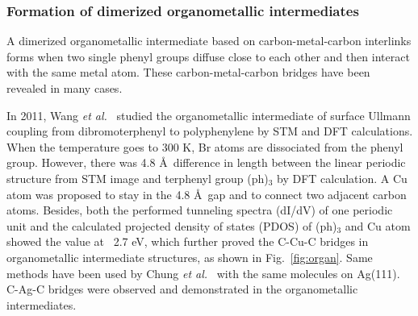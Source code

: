 \documentclass[%
 reprint,
 amsmath,amssymb,
 aps,
prb,
]{revtex4-1}
\begin{document}


\subsubsection{Formation of dimerized organometallic intermediates}

A dimerized organometallic intermediate based on carbon-metal-carbon interlinks forms when two single phenyl groups diffuse close to each other and then interact with the same metal atom. These carbon-metal-carbon bridges have been revealed in many cases. 

In 2011, Wang \textit{et al.}~\cite{jacs2011} studied the organometallic intermediate of surface Ullmann coupling from dibromoterphenyl to polyphenylene by STM and DFT calculations. When the temperature goes to 300 K, Br atoms are dissociated from the phenyl group. However, there was 4.8 \AA\ difference in length between the linear periodic structure from STM image and terphenyl group (ph)$_{3}$ by DFT calculation. A Cu atom was proposed to stay in the 4.8 \AA\ gap and to connect two adjacent carbon atoms. Besides, both the performed tunneling spectra (dI/dV) of one periodic unit and the calculated projected density of states (PDOS) of (ph)$_{3}$ and Cu atom showed the value at ~2.7 eV, which further proved the C-Cu-C bridges in organometallic intermediate structures, as shown in Fig.~\ref{fig:organ}. Same methods have been used by Chung \textit{et al.}~\cite{PCCP2012} with the same molecules on Ag(111). C-Ag-C bridges were observed and demonstrated in the organometallic intermediates.
\end{document}
